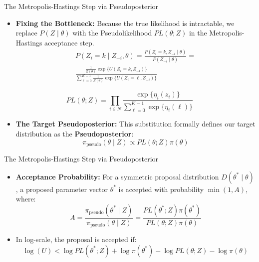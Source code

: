 \documentclass[
  ignorenonframetext,
]{beamer}
\providecommand{\tightlist}{%
  \setlength{\itemsep}{0pt}\setlength{\parskip}{0pt}}\usepackage{longtable,booktabs,array}
\begin{document}
\begin{frame}{The Metropolis-Hastings Step via Pseudoposterior}
\label{the-metropolis-hastings-step-via-pseudoposterior}
\begin{itemize}
\tightlist
\item
  \textbf{Fixing the Bottleneck:} Because the true likelihood is
  intractable, we replace \(P(Z \mid \theta)\) with the Pseudolikelihood
  \(PL(\theta; Z)\) in the Metropolis-Hastings acceptance step. \[
  \begin{aligned}
  P(Z_i = k \mid Z_{-i}, \theta) = \frac{P(Z_i = k, Z_{-i} \mid \theta)}{P(Z_{-i} \mid \theta)} = \\
  \frac{\frac{1}{Z(\theta)} \exp\{U(Z_i = k, Z_{-i})\}}{\sum_{\ell=0}^{K-1} \frac{1}{Z(\theta)} \exp\{U(Z_i = \ell, Z_{-i})\}}
  \end{aligned}
  \]
\end{itemize}

\[PL(\theta; Z) = \prod_{i \in N} \frac{\exp\{\eta_i(z_i)\}}{\sum_{\ell=0}^{K-1} \exp\{\eta_i(\ell)\}}\]

\begin{itemize}
\tightlist
\item
  \textbf{The Target Pseudoposterior:} This substitution formally
  defines our target distribution as the \textbf{Pseudoposterior}:
  \[\pi_{\text{pseudo}}(\theta \mid Z) \propto PL(\theta; Z) \pi(\theta)\]
\end{itemize}
\end{frame}

\begin{frame}{The Metropolis-Hastings Step via Pseudoposterior}
\label{the-metropolis-hastings-step-via-pseudoposterior-1}
\begin{itemize}
\tightlist
\item
  \textbf{Acceptance Probability:} For a symmetric proposal distribution
  \(D(\theta^* \mid \theta)\), a proposed parameter vector \(\theta^*\)
  is accepted with probability \(\min(1, A)\), where:
  \[A = \frac{\pi_{\text{pseudo}}(\theta^* \mid Z)}{\pi_{\text{pseudo}}(\theta \mid Z)} = \frac{PL(\theta^*; Z) \pi(\theta^*)}{PL(\theta; Z) \pi(\theta)}\]
\item
  In log-scale, the proposal is accepted if:
  \[\log(U) < \log PL(\theta^*; Z) + \log \pi(\theta^*) - \log PL(\theta; Z) - \log \pi(\theta)\]
\end{itemize}
\end{frame}
\end{document}
